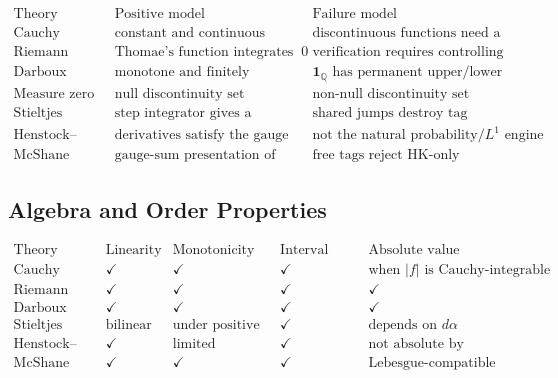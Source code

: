 \begin{exposition}
\[
\begin{array}{c|c|c}
\text{Theory} & \text{Positive model} & \text{Failure model}\\
\hline
\text{Cauchy} &
\text{constant and continuous functions} &
\text{discontinuous functions need a better test}\\
\text{Riemann} &
\text{Thomae's function integrates to }0 &
\text{verification requires controlling all tags}\\
\text{Darboux} &
\text{monotone and finitely discontinuous functions} &
\mathbf 1_{\mathbb Q}\text{ has permanent upper/lower gap}\\
\text{Measure zero} &
\text{null discontinuity set} &
\text{non-null discontinuity set}\\
\text{Stieltjes} &
\text{step integrator gives a weighted finite sum} &
\text{shared jumps destroy tag independence}\\
\text{Henstock--Kurzweil} &
\text{derivatives satisfy the gauge FTC} &
\text{not the natural probability/}L^1\text{ engine}\\
\text{McShane} &
\text{gauge-sum presentation of Lebesgue integration} &
\text{free tags reject HK-only cancellation}
\end{array}
\]
\end{exposition}

\subsection*{Algebra and Order Properties}

\begin{exposition}
\[
\begin{array}{c|c|c|c|c}
\text{Theory} & \text{Linearity} & \text{Monotonicity} &
\text{Interval additivity} & \text{Absolute value control}\\
\hline
\text{Cauchy} & \checkmark & \checkmark & \checkmark &
\text{when }|f|\text{ is Cauchy-integrable}\\
\text{Riemann} & \checkmark & \checkmark & \checkmark & \checkmark\\
\text{Darboux} & \checkmark & \checkmark & \checkmark & \checkmark\\
\text{Stieltjes} & \text{bilinear} & \text{under positive rulers} &
\checkmark & \text{depends on }d\alpha\\
\text{Henstock--Kurzweil} & \checkmark & \text{limited} &
\checkmark & \text{not absolute by design}\\
\text{McShane} & \checkmark & \checkmark & \checkmark &
\text{Lebesgue-compatible}
\end{array}
\]
\end{exposition}

